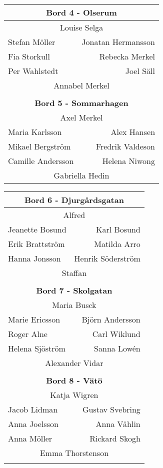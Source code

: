 \documentclass[a5paper]{article}
\begin{document}
\begin{landscape}
\begin{center}
\begin{tabular}{  l r }
		\multicolumn{2}{c}{\textbf{		Bord 4 - Olserum	}} \\ \hline
		\multicolumn{2}{c}{	Louise Selga		}   \\
		Stefan Möller	&	Jonatan Hermansson	\\
		Fia Storkull	&	Rebecka Merkel	\\
		Per Wahlstedt	&	Joel Säll	\\
		\multicolumn{2}{c}{	Annabel Merkel		}   \\
		\\
		
		\multicolumn{2}{c}{\textbf{		Bord 5 - Sommarhagen	}} \\ \hline
		\multicolumn{2}{c}{	Axel Merkel		}   \\
		Maria Karlsson	&	Alex Hansen	\\
		Mikael Bergström	&	Fredrik Valdeson	\\
		Camille Andersson	&	Helena Niwong	\\
		\multicolumn{2}{c}{	Gabriella Hedin		}   \\
		
	\end{tabular}			
	\quad \hspace*{2cm}			
	\begin{tabular}{  l r }			
		
		\multicolumn{2}{c}{\textbf{		Bord 6 - Djurgårdsgatan	}} \\ \hline
		\multicolumn{2}{c}{	Alfred		}   \\
		Jeanette Bosund	&	Karl Bosund	\\
		Erik Brattström	&	Matilda Arro	\\
		Hanna Jonsson	&	Henrik Söderström	\\
		\multicolumn{2}{c}{	Staffan		}   \\
		\\
		
		\multicolumn{2}{c}{\textbf{		Bord 7 - Skolgatan	}} \\ \hline
		\multicolumn{2}{c}{	Maria Busck		}   \\
		Marie Ericsson	&	Björn Andersson	\\
		Roger Alne	&	Carl Wiklund	\\
		Helena Sjöström	&	Sanna Lowén	\\
		\multicolumn{2}{c}{	Alexander Vidar		}   \\
		\\
		
		\multicolumn{2}{c}{\textbf{		Bord 8 - Vätö	}} \\ \hline
		\multicolumn{2}{c}{	Katja Wigren		}   \\
		Jacob Lidman	&	Gustav Svebring	\\
		Anna Joelsson	&	Anna Våhlin	\\
		Anna Möller	&	Rickard Skogh	\\
		\multicolumn{2}{c}{	Emma Thorstenson		}   \\
		\\
		

\end{tabular}
\end{center}
\end{landscape}
\end{document}
